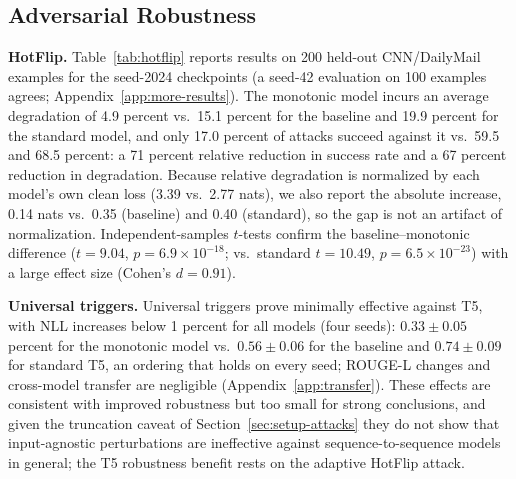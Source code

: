 \documentclass{article}
\theoremstyle{plain}
\theoremstyle{definition}
\theoremstyle{remark}
\theoremstyle{plain}
\begin{document}
\subsection{Adversarial Robustness}
\label{sec:results-robustness}
\textbf{HotFlip.}
Table~\ref{tab:hotflip} reports results on 200 held-out CNN/DailyMail examples for the seed-2024 checkpoints (a seed-42 evaluation on 100 examples agrees; Appendix~\ref{app:more-results}). The monotonic model incurs an average degradation of 4.9 percent vs.\ 15.1 percent for the baseline and 19.9 percent for the standard model, and only 17.0 percent of attacks succeed against it vs.\ 59.5 and 68.5 percent: a 71 percent relative reduction in success rate and a 67 percent reduction in degradation. Because relative degradation is normalized by each model's own clean loss (3.39 vs.\ 2.77 nats), we also report the absolute increase, 0.14 nats vs.\ 0.35 (baseline) and 0.40 (standard), so the gap is not an artifact of normalization. Independent-samples $t$-tests confirm the baseline--monotonic difference ($t = 9.04$, $p = 6.9 \times 10^{-18}$; vs.\ standard $t = 10.49$, $p = 6.5 \times 10^{-23}$) with a large effect size (Cohen's $d = 0.91$).

\textbf{Universal triggers.}
Universal triggers prove minimally effective against T5, with NLL increases below 1 percent for all models (four seeds): $0.33 \pm 0.05$ percent for the monotonic model vs.\ $0.56 \pm 0.06$ for the baseline and $0.74 \pm 0.09$ for standard T5, an ordering that holds on every seed; ROUGE-L changes and cross-model transfer are negligible (Appendix~\ref{app:transfer}). These effects are consistent with improved robustness but too small for strong conclusions, and given the truncation caveat of Section~\ref{sec:setup-attacks} they do not show that input-agnostic perturbations are ineffective against sequence-to-sequence models in general; the T5 robustness benefit rests on the adaptive HotFlip attack.
\end{document}
